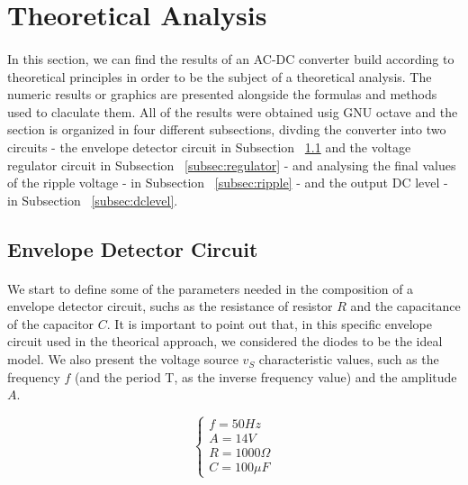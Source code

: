 \section{Theoretical Analysis}
\label{sec:analysis}

\paragraph{}
In this section, we can find the results of an AC-DC converter build according to theoretical principles in order to be the subject of a theoretical analysis. The numeric results or graphics are presented alongside the formulas and methods used to claculate them. All of the results were obtained usig GNU octave and the section is organized in four different subsections, divding the converter into two circuits - the envelope detector circuit in Subsection ~\ref{subsec:envelope} and the voltage regulator circuit in Subsection ~\ref{subsec:regulator} - and analysing the final values of the ripple voltage - in Subsection ~\ref{subsec:ripple} - and the output DC level - in Subsection ~\ref{subsec:dclevel}.



\subsection{Envelope Detector Circuit}
\label{subsec:envelope}

\paragraph{}
We start to define some of the parameters needed in the composition of a envelope detector circuit, suchs as the resistance of resistor $R$ and the capacitance of the capacitor $C$. It is important to point out that, in this specific envelope circuit used in the theorical approach, we considered the diodes to be the ideal model. We also present the voltage source $v_S$ characteristic values, such as the frequency $f$ (and the period T, as the inverse frequency value) and the amplitude $A$.

\[
\left\{\begin{matrix}
f = 50 Hz\\
A= 14 V\\
R= 1000 \Omega\\
C=100 \mu F
\end{matrix}\right.
\]

